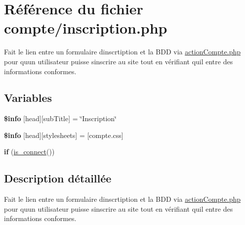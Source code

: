 \hypertarget{inscription_8php}{}\section{Référence du fichier compte/inscription.php}
\label{inscription_8php}


Fait le lien entre un formulaire d\textquotesingle{}inscrtiption et la B\+DD via \hyperlink{actionCompte_8php}{action\+Compte.\+php} pour qu\textquotesingle{}un utilisateur puisse s\textquotesingle{}inscrire au site tout en vérifiant qu\textquotesingle{}il entre des informations conformes.  


\subsection*{Variables}
\begin{DoxyCompactItemize}
\item 
\mbox{\label{inscription_8php_a024f87f9bf4f3b33710e2e7ff8f60823}} 
{\bfseries \$info} \mbox{[}\textquotesingle{}head\textquotesingle{}\mbox{]}\mbox{[}\textquotesingle{}sub\+Title\textquotesingle{}\mbox{]} = \char`\"{}Inscription\char`\"{}
\item 
\mbox{\label{inscription_8php_af6044c8bf78ebc8c58057e14d7738bbd}} 
{\bfseries \$info} \mbox{[}\textquotesingle{}head\textquotesingle{}\mbox{]}\mbox{[}\textquotesingle{}stylesheets\textquotesingle{}\mbox{]} = \mbox{[}\textquotesingle{}compte.\+css\textquotesingle{}\mbox{]}
\item 
\mbox{\label{inscription_8php_ac29594db2ad90ca09cd45b9bfe69e5a2}} 
{\bfseries if} (\hyperlink{fonctionCompte_8php_a2fe594e0482307b8729ea37780d6f74b}{is\+\_\+connect}())
\end{DoxyCompactItemize}


\subsection{Description détaillée}
Fait le lien entre un formulaire d\textquotesingle{}inscrtiption et la B\+DD via \hyperlink{actionCompte_8php}{action\+Compte.\+php} pour qu\textquotesingle{}un utilisateur puisse s\textquotesingle{}inscrire au site tout en vérifiant qu\textquotesingle{}il entre des informations conformes. 

